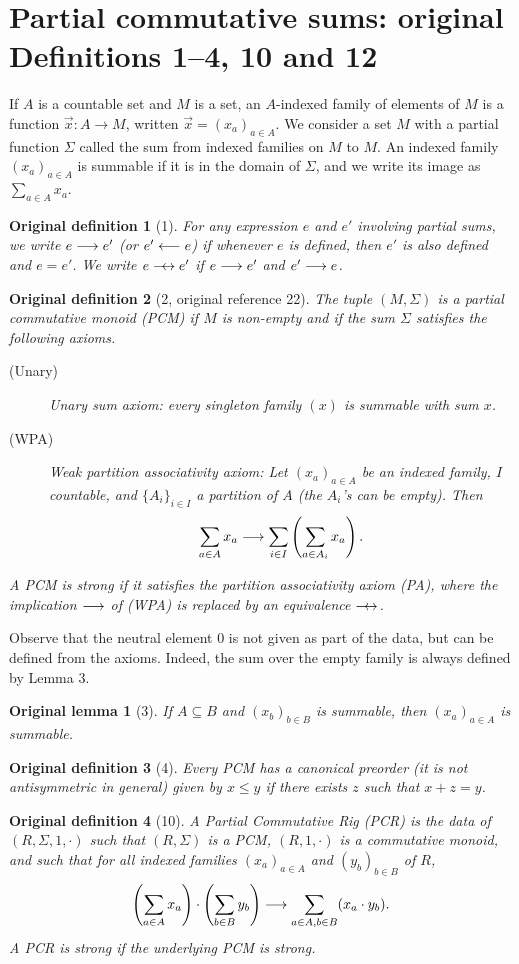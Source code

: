 \documentclass[10pt,a4paper]{article}
\newcommand{\dimp}{\mathrel{\relbar\joinrel\rightarrow}}
\newcommand{\dequiv}{\mathrel{\relbar\joinrel\leftrightarrow}}
\newtheorem*{originaldef}{Original definition}
\newtheorem*{originallemma}{Original lemma}
\begin{document}
\section*{Partial commutative sums: original Definitions 1--4, 10 and 12}
If $A$ is a countable set and $M$ is a set, an $A$-indexed family of elements of $M$ is a function $\vec x:A\to M$, written $\vec x=(x_a)_{a\in A}$. We consider a set $M$ with a partial function $\Sigma$ called the sum from indexed families on $M$ to $M$. An indexed family $(x_a)_{a\in A}$ is summable if it is in the domain of $\Sigma$, and we write its image as $\sum_{a\in A}x_a$.
\begin{originaldef}[1]
For any expression $e$ and $e'$ involving partial sums, we write $e\dimp e'$ (or $e'\mathrel{\leftarrow\joinrel\relbar}e$) if whenever $e$ is defined, then $e'$ is also defined and $e=e'$. We write $e\dequiv e'$ if $e\dimp e'$ and $e'\dimp e$.
\end{originaldef}
\begin{originaldef}[2, original reference 22]
The tuple $(M,\Sigma)$ is a partial commutative monoid (PCM) if $M$ is non-empty and if the sum $\Sigma$ satisfies the following axioms.
\begin{description}
\item[(Unary)] Unary sum axiom: every singleton family $(x)$ is summable with sum $x$.
\item[(WPA)] Weak partition associativity axiom: Let $(x_a)_{a\in A}$ be an indexed family, $I$ countable, and $\{A_i\}_{i\in I}$ a partition of $A$ (the $A_i$'s can be empty). Then
\[\sum_{a\in A}x_a\dimp\sum_{i\in I}\left(\sum_{a\in A_i}x_a\right).\]
\end{description}
A PCM is strong if it satisfies the partition associativity axiom (PA), where the implication $\dimp$ of (WPA) is replaced by an equivalence $\dequiv$.
\end{originaldef}
Observe that the neutral element $0$ is not given as part of the data, but can be defined from the axioms. Indeed, the sum over the empty family is always defined by Lemma 3.
\begin{originallemma}[3] If $A\subseteq B$ and $(x_b)_{b\in B}$ is summable, then $(x_a)_{a\in A}$ is summable.\end{originallemma}
\begin{originaldef}[4] Every PCM has a canonical preorder (it is not antisymmetric in general) given by $x\leq y$ if there exists $z$ such that $x+z=y$.\end{originaldef}
\begin{originaldef}[10]
A Partial Commutative Rig (PCR) is the data of $(R,\Sigma,1,\cdot)$ such that $(R,\Sigma)$ is a PCM, $(R,1,\cdot)$ is a commutative monoid, and such that for all indexed families $(x_a)_{a\in A}$ and $(y_b)_{b\in B}$ of $R$,
\[\left(\sum_{a\in A}x_a\right)\cdot\left(\sum_{b\in B}y_b\right)\dimp\sum_{a\in A,b\in B}(x_a\cdot y_b).\]
A PCR is strong if the underlying PCM is strong.
\end{originaldef}
\end{document}
